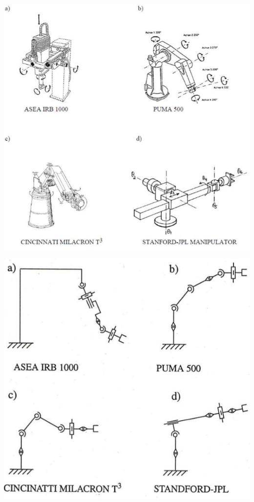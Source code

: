\begin{minipage}{0.5\linewidth}
\includegraphics[width=0.8\linewidth]{./bilder/KinAuf}
\end{minipage}
\begin{minipage}{0.5\linewidth}
\includegraphics[width=0.8\linewidth]{./bilder/KinAufL}
\end{minipage}
\clearpage
